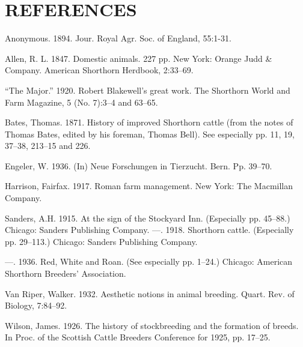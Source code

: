 \section*{REFERENCES}

\begin{hangparas}{0.5in}{1}%
Anonymous. 1894. Jour. Royal Agr. Soc. of England, 55:1-31.

Allen, R. L. 1847. Domestic animals. 227 pp. New York: Orange Judd \& Company. American Shorthorn Herdbook, 2:33--69.

``The Major.'' 1920. Robert Blakewell's great work. The Shorthorn World and Farm Magazine, 5 (No. 7):3--4 and 63--65.

Bates, Thomas. 1871. History of improved Shorthorn cattle (from the notes of Thomas Bates, edited by his foreman, Thomas 
Bell). See especially pp. 11, 19, 37--38, 213--15 and 226.

Engeler, W. 1936. (In) Neue Forschungen in Tierzucht. Bern. Pp. 39--70.

Harrison, Fairfax. 1917. Roman farm management. New York: The Macmillan Company.

Sanders, A.H. 1915. At the sign of the Stockyard Inn. (Especially pp. 45--88.) Chicago: Sanders Publishing Company.
---. 1918. Shorthorn cattle. (Especially pp. 29--113.) Chicago: Sanders Publishing Company.

---. 1936. Red, White and Roan. (See especially pp. 1--24.) Chicago: American Shorthorn Breeders' Association.

Van Riper, Walker. 1932. Aesthetic notions in animal breeding. Quart. Rev. of Biology, 7:84--92.

Wilson, James. 1926. The history of stockbreeding and the formation of breeds. In Proc. of the Scottish Cattle Breeders Conference for 1925, pp. 17--25.
\end{hangparas}
